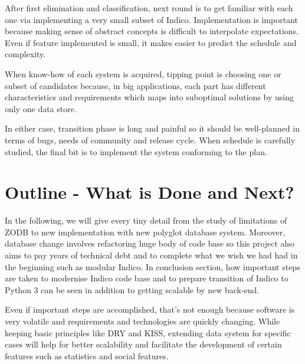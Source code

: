 \par After first elimination and classification, next round is to get familiar with each one via implementing a very small subset of Indico. Implementation is important because making sense of abstract concepts is difficult to interpolate expectations. Even if feature implemented is small, it makes easier to predict the schedule and complexity.

\par When know-how of each system is acquired, tipping point is choosing one or subset of candidates because,  in big applications, each part has different characteristics and requirements which maps into suboptimal solutions by using only one data store.

\par In either case, transition phase is long and painful so it should be well-planned in terms of bugs, needs of community and release cycle. When schedule is carefully studied, the final bit is to implement the system conforming to the plan.

\section{Outline - What is Done and Next?}

\par In the following, we will give every tiny detail from the study of limitations of ZODB to new implementation with new polyglot database system. Moreover, database change involves refactoring huge body of code base so this project also aims to pay years of technical debt and to complete what we wish we had had in the beginning such as modular Indico. In conclusion section, how important steps are taken to modernise Indico code base and to prepare transition of Indico to Python 3 can be seen in addition to getting scalable by new back-end.

\par Even if important steps are accomplished, that's not enough because software is very volatile and requirements and technologies are quickly changing. While keeping basic principles like DRY and KISS, extending data system for specific cases will help for better scalability and facilitate the development of certain features such as statistics and social features.

